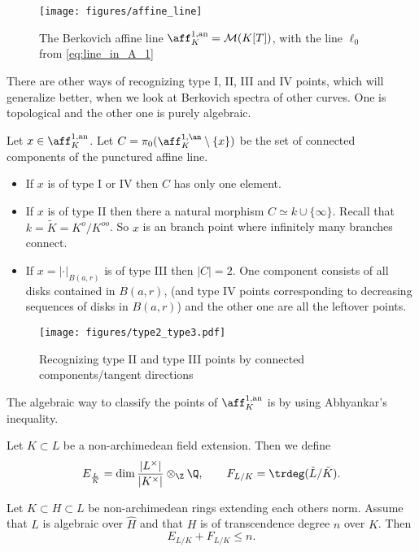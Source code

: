 \begin{figure}[h]
	\centering
	\texttt{[image: figures/affine\_line]}
	\caption{The Berkovich affine line $\aff_K^{1, \text{an}} = \mathcal{M} (K[T])$, with the line $\ell_0$ from \cref{eq:line_in_A_1}}
	\label{fig:affine_line}
\end{figure}

There are other ways of recognizing type I, II, III and IV points, which will generalize better, when we look at Berkovich spectra of other curves. One is topological and the other one is purely algebraic. 

\begin{proposition}
	Let $x \in \aff_K^{1,\text{an}}$. 
	Let $C = \pi_0(\aff_K^{1, \an}\setminus \{ x\} )$ be the set of connected components of the punctured affine line. 
	\begin{itemize}
		\item If $x$ is of type I  or IV then $C$ has only one element.
		\item If $x$ is of type II then there a natural morphism $C \simeq k \cup \{\infty\} $. Recall that $k = \tilde K = K^{o} / K^{oo} $. 
			So $x$ is an branch point where infinitely many branches connect. 
		\item If $x = |\cdot |_{B(a, r)}$ is of type III then $|C| = 2$. One component consists of all disks contained in $B(a, r)$, (and type IV points corresponding to decreasing sequences of disks in $B(a,r)$) and the other one are all the leftover points. 
	\end{itemize}
\end{proposition}
\begin{figure}[h]
	\centering
	\texttt{[image: figures/type2\_type3.pdf]}
	\caption{Recognizing type II and type III points by connected components/tangent directions}
	\label{fig:figures-type2_type3-pdf}
\end{figure}
The algebraic way to classify the points of $\aff_K^{1,\text{an}}$ is by using Abhyankar's inequality. 
\begin{definition}
	Let $K \subset L$ be a non-archimedean field extension. 
	Then we define \[
		E_{\frac{L}{ K}} = \dim \frac{|L^{\times }|}{|K^{\times }|} \otimes_\Z \Q, \qquad F_{L / K} = \trdeg(\tilde L / \tilde K)
	.\] 
\end{definition}

\begin{theorem}
	Let $K \subset H \subset L$ be non-archimedean rings extending each others norm. Assume that $L$ is algebraic over $\hat{H}$ and that $H$ is of transcendence degree $n$ over $K$. Then \[
	E_{L / K} + F_{L / K}  \le n
	.\] 
\end{theorem}

